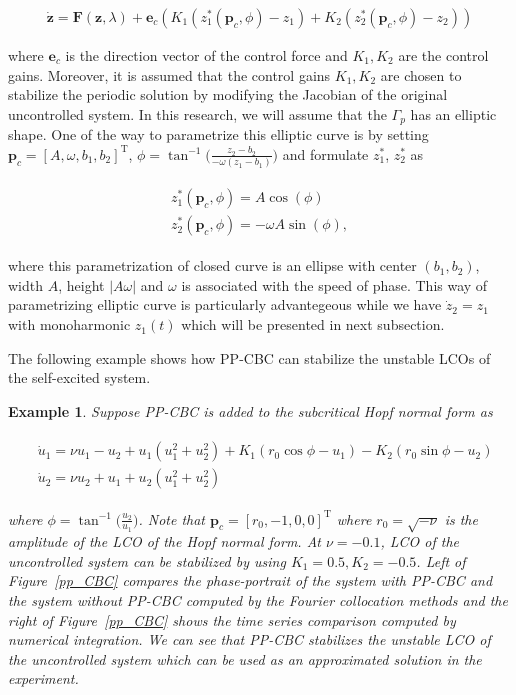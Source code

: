 \documentclass[openacc]{rsproca_new}%
\theoremstyle{own}
\newtheorem{example}{Example}[section]
\def\vec#1{\ensuremath{\mathbf{#1}}}
\newcommand{\Fref}[1]{Figure~\ref{#1}}
\begin{document}
\begin{align}\label{CBC+}
\dot{\vec{z}}= \vec F(\vec{z},\lambda)+\vec e_c (K_1(z^*_1(\vec p_c,\phi)-z_1)+ K_2(z^*_2(\vec p_c,\phi) -z_2))
\end{align}

\noindent where $\vec e_c$ is the direction vector of the control force and $K_1, K_2$ are the control gains. Moreover, it is assumed that the control gains $K_1,K_2$ are chosen to stabilize the periodic solution by modifying the Jacobian of the original uncontrolled system. In this research, we will assume that the $\Gamma_p$ has an elliptic shape. One of the way to parametrize this elliptic curve is by setting $\vec p_c=[A,\omega,b_1,b_2]^\textrm{T}$, $\phi=\tan^{-1}\Big(\frac{z_2-b_2}{-\omega(z_1-b_1)}\Big)$  and formulate $z^*_1$, $z^*_2$ as

\begin{align}\label{PP_curve2}
	\begin{split}
z^*_1(\vec p_c,\phi)=A\cos(\phi)\\
z^*_2(\vec p_c,\phi)=-\omega A\sin(\phi),
\end{split}
\end{align}

\noindent where this parametrization of closed curve is an ellipse with center $(b_1,b_2)$, width $A$, height $|A\omega|$ and $\omega$ is associated with the speed of phase. This way of parametrizing elliptic curve is particularly advantegeous while we have $\dot z_2=z_1$ with monoharmonic $z_1(t)$ which will be presented in next subsection.

The following example shows how PP-CBC can stabilize the unstable LCOs of the self-excited system.

\begin{example}
Suppose PP-CBC is added to the subcritical Hopf normal form as

\begin{align}\label{PP_HopfNF}
	\begin{split}
&\dot u_1=\nu u_1 -u_2+u_1(u_1^2+u_2^2)+K_1(r_0 \cos \phi-u_1)-K_2(r_0 \sin \phi-u_2)\\
&\dot u_2=\nu u_2 +u_1+u_2(u_1^2+u_2^2)
\end{split}
\end{align}

\noindent where $\phi=\tan^{-1}\Big(\frac{u_2}{u_1}\Big)$. Note that $\vec p_c=[r_0,-1,0,0]^\textrm{T}$ where $r_0=\sqrt{-\nu}$ is the amplitude of the LCO of the Hopf normal form. At $\nu=-0.1$, LCO of the uncontrolled system can be stabilized by using $K_1=0.5,K_2=-0.5$. Left of \Fref{pp_CBC} compares the phase-portrait of the system with PP-CBC and the system without PP-CBC computed by the Fourier collocation methods and the right of \Fref{pp_CBC} shows the time series comparison computed by numerical integration. We can see that PP-CBC stabilizes the unstable LCO of the uncontrolled system which can be used as an approximated solution in the experiment.
\end{example}
\end{document}
